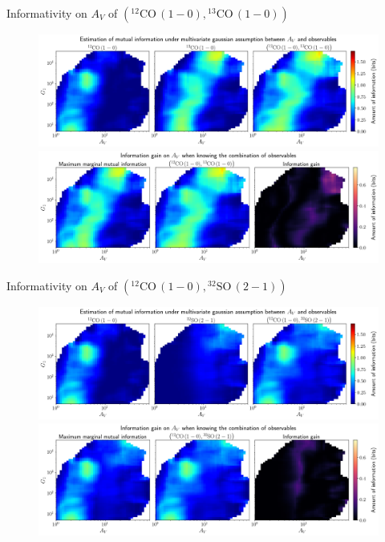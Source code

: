 \documentclass{beamer}
\begin{document}
\begin{frame}{Informativity on $A_V$ of $\left(\mathrm{^{12}CO\,(1-0)},\mathrm{^{13}CO\,(1-0)}\right)$}
    \begin{figure}
        \centering
        \includegraphics[width=0.95\linewidth]{../linearinfo/av__12co10_13co10_linearinfo.png}
        \vfill
        \includegraphics[width=0.95\linewidth]{../linearinfo/av__12co10_13co10_linearinfo_gain.png}
    \end{figure}
\end{frame}

\begin{frame}{Informativity on $A_V$ of $\left(\mathrm{^{12}CO\,(1-0)},\mathrm{^{32}SO\,(2-1)}\right)$}
    \begin{figure}
        \centering
        \includegraphics[width=0.95\linewidth]{../linearinfo/av__12co10_32so21_linearinfo.png}
        \vfill
        \includegraphics[width=0.95\linewidth]{../linearinfo/av__12co10_32so21_linearinfo_gain.png}
    \end{figure}
\end{frame}
\end{document}
